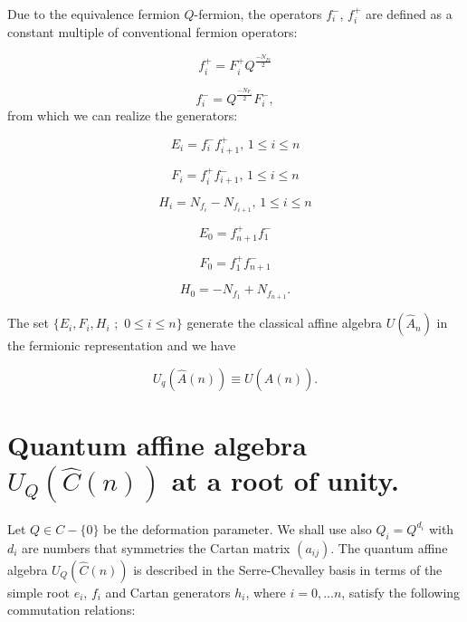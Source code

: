 \documentclass[a4paper,12pt,thmsa]{article}
\begin{document}
Due to the equivalence fermion $Q$-fermion, the operators $f_i^{-}$, $f_i^{+}
$ are defined as a constant multiple of conventional fermion operators:

\begin{equation}
f_i^{+}=F_i^{+}Q^{\frac{-N_{Fi}}2}
\end{equation}

\begin{equation}
f_i^{-}=Q^{\frac{-N_{F_i}}2}F_i^{-},
\end{equation}
from which we can realize the generators:

\begin{equation}
E_i=f_i^{-}f_{i+1}^{+},\, 1\leq i\leq n
\end{equation}

\begin{equation}
F_i=f_i^{+}f_{i+1}^{-},\, 1\leq i\leq n
\end{equation}

\begin{equation}
H_i=N_{f_i}-N_{f_{i+1}},\, 1\leq i\leq n
\end{equation}

\begin{equation}
E_0=f_{n+1}^{+}f_1^{-}
\end{equation}

\begin{equation}
F_{0}=f_{1}^{+}f_{n+1}^{-}
\end{equation}

\begin{equation}
H_0=-N_{f_1}+N_{f_{n+1}}.
\end{equation}

The set $\{E_i,F_i,H_i$ $;$ $0\leq i\leq n\}$ generate the classical affine
algebra $U(\hat A_n)$ in the fermionic representation and we have

\[
U_q(\hat A(n))\equiv U(\hat A(n)).
\]

\section{Quantum affine algebra $U_Q(\widehat{C}(n))$ at a root of unity.}

Let $Q\in C-\{0\}$ be the deformation parameter. We shall use also $%
Q_i=Q^{d_i}$ with $d_i$ are numbers that symmetries the Cartan matrix $%
(a_{ij})$. The quantum affine algebra $U_Q(\widehat{C}(n))$ is described in
the Serre-Chevalley basis in terms of the simple root $e_i$, $f_i$ and
Cartan generators $h_i$, where $i=0,...n$, satisfy the following commutation
relations:
\end{document}
